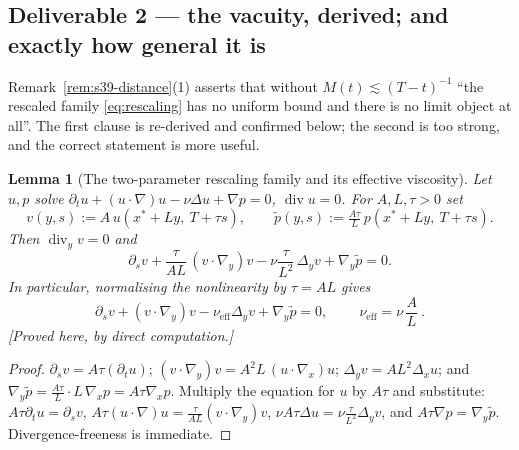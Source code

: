 \documentclass[11pt]{article}
\newtheorem{lemma}[theorem]{Lemma}
\theoremstyle{definition}
\theoremstyle{remark}
\newcommand{\divg}{\operatorname{div}}
\begin{document}
\subsection{Deliverable 2 --- the vacuity, derived; and exactly how general
it is}
\label{subsec:wpt1-dichotomy}

Remark~\ref{rem:s39-distance}(1) asserts that without $M(t)\lesssim(T-t)^{-1}$
``the rescaled family \eqref{eq:rescaling} has no uniform bound and there is
no limit object at all''. The first clause is re-derived and confirmed below;
the second is too strong, and the correct statement is more useful.

\begin{lemma}[The two-parameter rescaling family and its effective
  viscosity]\label{lem:wpt1-nueff}
  Let $u,p$ solve $\partial_tu+(u\cdot\nabla)u-\nu\Delta u+\nabla p=0$,
  $\divg u=0$. For $A,L,\tau>0$ set
  \[
    v(y,s):=A\,u(x^*+Ly,\ T+\tau s),\qquad
    \tilde p(y,s):=\tfrac{A\tau}{L}\,p(x^*+Ly,\ T+\tau s).
  \]
  Then $\divg_y v=0$ and
  \[
    \partial_s v+\frac{\tau}{AL}\,(v\cdot\nabla_y)v
      -\nu\frac{\tau}{L^2}\,\Delta_yv+\nabla_y\tilde p=0 .
  \]
  In particular, normalising the nonlinearity by $\tau=AL$ gives
  \[
    \partial_s v+(v\cdot\nabla_y)v-\nu_{\mathrm{eff}}\Delta_yv
      +\nabla_y\tilde p=0,
    \qquad
    \boxed{\ \nu_{\mathrm{eff}}=\nu\,\frac{A}{L}\ }.
  \]
  \emph{[Proved here, by direct computation.]}
\end{lemma}
\begin{proof}
  $\partial_sv=A\tau(\partial_tu)$;
  $(v\cdot\nabla_y)v=A^2L\,(u\cdot\nabla_x)u$;
  $\Delta_yv=AL^2\Delta_xu$; and
  $\nabla_y\tilde p=\frac{A\tau}{L}\cdot L\,\nabla_xp=A\tau\nabla_xp$.
  Multiply the equation for $u$ by $A\tau$ and substitute:
  $A\tau\partial_tu=\partial_sv$,
  $A\tau(u\cdot\nabla)u=\frac{\tau}{AL}(v\cdot\nabla_y)v$,
  $\nu A\tau\Delta u=\nu\frac{\tau}{L^2}\Delta_yv$, and
  $A\tau\nabla p=\nabla_y\tilde p$. Divergence-freeness is immediate.
\end{proof}
\end{document}
